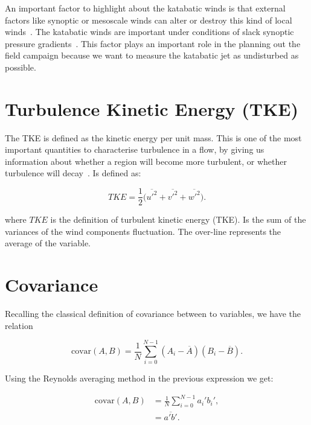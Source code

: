 An important factor to highlight about the katabatic winds is that external factors like synoptic or mesoscale winds can alter or destroy this kind of local winds~\citep{stull2012introduction}. The katabatic winds are important under conditions of slack synoptic pressure gradients~\citep{manins1979katabatic}. This factor plays an important role in the planning out the field campaign because we want to measure the katabatic jet as undisturbed as possible.


\section{Turbulence Kinetic Energy (TKE)}
The TKE is defined as the kinetic energy per unit mass. This is one of the most important quantities to characterise turbulence in a flow, by giving us information about whether a region will become more turbulent, or whether turbulence will decay~\citep{stull2012introduction}.  Is defined as:

\begin{equation}
    TKE = \frac{1}{2} \big(\overline{u'^2} + \overline{v'^2} + \overline{w'^2}\big). 
    \label{eq:tke}
\end{equation}

\noindent where $TKE$ is the definition of turbulent kinetic energy (TKE). Is the sum of the variances of the wind components fluctuation. The over-line represents the average of the variable. 

\section{Covariance}

Recalling the classical definition of covariance between to variables, we have the relation 

\begin{equation}
    \text{covar}(A,B) = \frac{1}{N}\sum_{i=0}^{N-1} (A_i - \overline{A})(B_i - \overline{B}).
\end{equation}

\noindent Using the Reynolds averaging method in the previous expression we get:

\begin{subequations}
\begin{align}
    \text{covar}(A,B) &= \frac{1}{N}\sum_{i=0}^{N-1} a_i' b_i', \\
    &= \overline{a'b'}.
\end{align}
\end{subequations}

